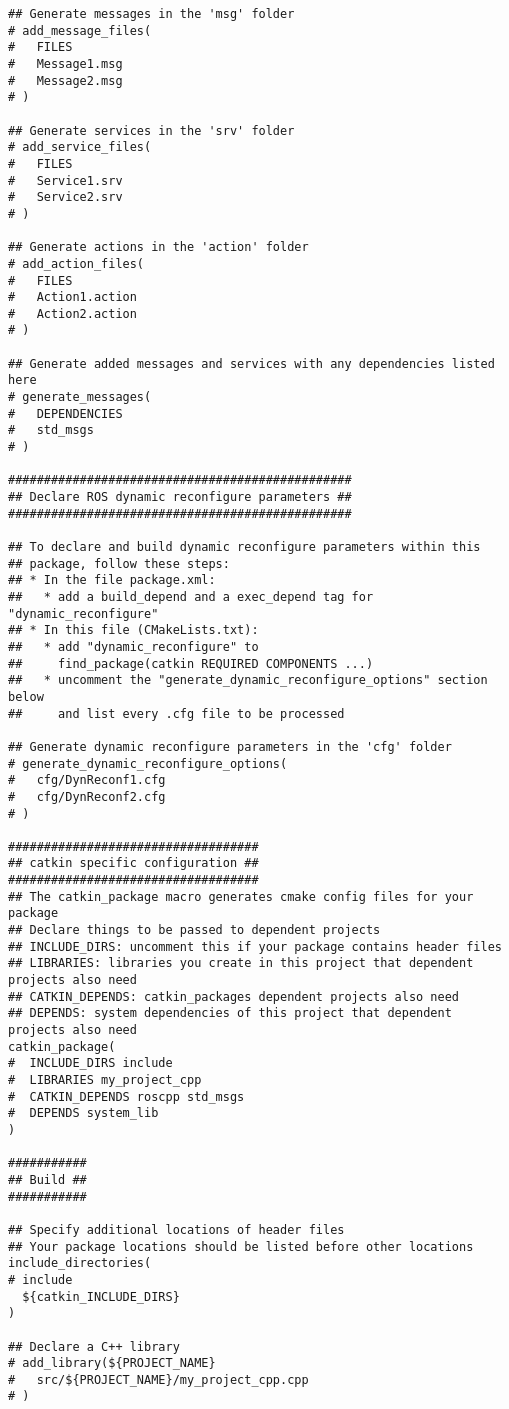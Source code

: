 \documentclass[letterpaper]{article}
\begin{document}
\begin{lstlisting}[style=xmlstyle, title=src/my\_project\_cpp/CMakeLists.txt]
## Generate messages in the 'msg' folder
# add_message_files(
#   FILES
#   Message1.msg
#   Message2.msg
# )

## Generate services in the 'srv' folder
# add_service_files(
#   FILES
#   Service1.srv
#   Service2.srv
# )

## Generate actions in the 'action' folder
# add_action_files(
#   FILES
#   Action1.action
#   Action2.action
# )

## Generate added messages and services with any dependencies listed here
# generate_messages(
#   DEPENDENCIES
#   std_msgs
# )

################################################
## Declare ROS dynamic reconfigure parameters ##
################################################

## To declare and build dynamic reconfigure parameters within this
## package, follow these steps:
## * In the file package.xml:
##   * add a build_depend and a exec_depend tag for "dynamic_reconfigure"
## * In this file (CMakeLists.txt):
##   * add "dynamic_reconfigure" to
##     find_package(catkin REQUIRED COMPONENTS ...)
##   * uncomment the "generate_dynamic_reconfigure_options" section below
##     and list every .cfg file to be processed

## Generate dynamic reconfigure parameters in the 'cfg' folder
# generate_dynamic_reconfigure_options(
#   cfg/DynReconf1.cfg
#   cfg/DynReconf2.cfg
# )

###################################
## catkin specific configuration ##
###################################
## The catkin_package macro generates cmake config files for your package
## Declare things to be passed to dependent projects
## INCLUDE_DIRS: uncomment this if your package contains header files
## LIBRARIES: libraries you create in this project that dependent projects also need
## CATKIN_DEPENDS: catkin_packages dependent projects also need
## DEPENDS: system dependencies of this project that dependent projects also need
catkin_package(
#  INCLUDE_DIRS include
#  LIBRARIES my_project_cpp
#  CATKIN_DEPENDS roscpp std_msgs
#  DEPENDS system_lib
)

###########
## Build ##
###########

## Specify additional locations of header files
## Your package locations should be listed before other locations
include_directories(
# include
  ${catkin_INCLUDE_DIRS}
)

## Declare a C++ library
# add_library(${PROJECT_NAME}
#   src/${PROJECT_NAME}/my_project_cpp.cpp
# )


\end{lstlisting}
\end{document}
